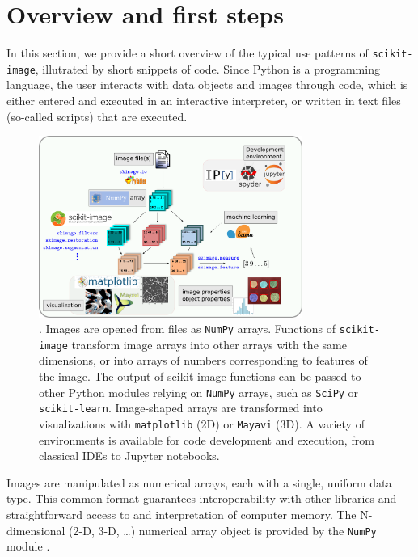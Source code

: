 \documentclass[twocolumn]{bmcart}%
\begin{document}
\section*{Overview and first steps}

In this section, we provide a short overview of the typical use patterns of
\texttt{scikit-image}, illutrated by short snippets of code. Since
Python is a programming language, the user interacts with data objects and
images through code, which is either entered and executed in an interactive
interpreter, or written in text files (so-called scripts) that are executed. 

\begin{figure}
    \centerline{\includegraphics[width=0.77\textwidth]{ecosystem_landscape}}
    \caption{. Images are opened from files as \texttt{NumPy}
	arrays. Functions of \texttt{scikit-image} transform image arrays
	into other arrays with the same dimensions, or into arrays of
	numbers corresponding to features of the image. The output of
	scikit-image functions can be passed to other Python modules
	relying on \texttt{NumPy} arrays, such as \texttt{SciPy} or
	\texttt{scikit-learn}. Image-shaped arrays are transformed into
	visualizations with \texttt{matplotlib} (2D) or \texttt{Mayavi}
	(3D). A variety of environments is available for code development
	and execution, from classical IDEs to Jupyter notebooks.
    \label{fig:ecosystem}}
\end{figure}


Images are manipulated as numerical arrays, each with a single, uniform
data type.  This common format guarantees interoperability with other
libraries and straightforward access to and interpretation of computer memory. The
N-dimensional (2-D, 3-D, \dots) numerical array object is provided by the
\texttt{NumPy} module \citep{Vanderwalt2011}.
\end{document}
